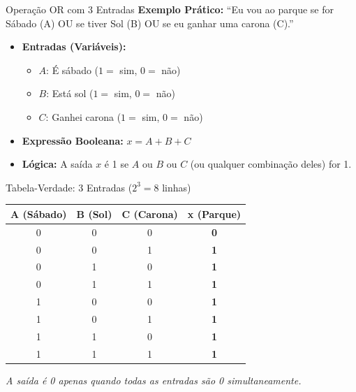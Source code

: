 \begin{frame}{Operação OR com 3 Entradas}
    \textbf{Exemplo Prático:} ``Eu vou ao parque se for Sábado (A) OU se tiver Sol (B) OU se eu ganhar uma carona (C).''
    \vspace{0.4cm}
    \begin{itemize}
        \item \textbf{Entradas (Variáveis):}
              \begin{itemize}
                  \item $A$: É sábado ($1=$ sim, $0=$ não)
                  \item $B$: Está sol ($1=$ sim, $0=$ não)
                  \item $C$: Ganhei carona ($1=$ sim, $0=$ não)
              \end{itemize}
        \item \textbf{Expressão Booleana:} $x = A + B + C$
        \item \textbf{Lógica:} A saída $x$ é 1 se $A$ ou $B$ ou $C$ (ou qualquer combinação deles) for 1.
    \end{itemize}
\end{frame}

\begin{frame}{Tabela-Verdade: 3 Entradas ($2^3 = 8$ linhas)}
    \begin{table}
        \centering
        \small
        \begin{tabular}{|c|c|c||c|}
            \hline
            \textbf{A (Sábado)} & \textbf{B (Sol)} & \textbf{C (Carona)} & \textbf{x (Parque)} \\ \hline
            0                   & 0                & 0                   & \textbf{0}          \\ \hline
            0                   & 0                & 1                   & \textbf{1}          \\ \hline
            0                   & 1                & 0                   & \textbf{1}          \\ \hline
            0                   & 1                & 1                   & \textbf{1}          \\ \hline
            1                   & 0                & 0                   & \textbf{1}          \\ \hline
            1                   & 0                & 1                   & \textbf{1}          \\ \hline
            1                   & 1                & 0                   & \textbf{1}          \\ \hline
            1                   & 1                & 1                   & \textbf{1}          \\ \hline
        \end{tabular}
    \end{table}
    \vspace{0.2cm}
    \centering
    \textit{A saída é 0 apenas quando todas as entradas são 0 simultaneamente.}
\end{frame}

